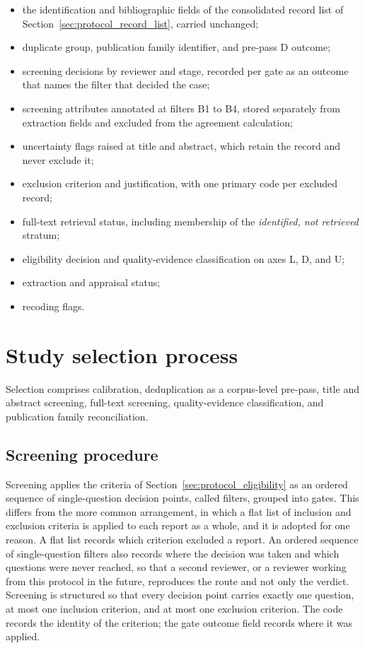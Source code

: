 \begin{itemize}
    \item the identification and bibliographic fields of the consolidated record list of Section~\ref{sec:protocol_record_list}, carried unchanged;
    \item duplicate group, publication family identifier, and pre-pass D outcome;
    \item screening decisions by reviewer and stage, recorded per gate as an outcome that names the filter that decided the case;
    \item screening attributes annotated at filters B1 to B4, stored separately from extraction fields and excluded from the agreement calculation;
    \item uncertainty flags raised at title and abstract, which retain the record and never exclude it;
    \item exclusion criterion and justification, with one primary code per excluded record;
    \item full-text retrieval status, including membership of the \textit{identified, not retrieved} stratum;
    \item eligibility decision and quality-evidence classification on axes L, D, and U;
    \item extraction and appraisal status;
    \item recoding flags.
\end{itemize}

\section{Study selection process}
\label{sec:protocol_selection}

Selection comprises calibration, deduplication as a corpus-level pre-pass, title and abstract screening, full-text screening, quality-evidence classification, and publication family reconciliation.

\subsection{Screening procedure}
\label{sec:protocol_gates}

Screening applies the criteria of Section~\ref{sec:protocol_eligibility} as an ordered sequence of single-question decision points, called filters, grouped into gates. This differs from the more common arrangement, in which a flat list of inclusion and exclusion criteria is applied to each report as a whole, and it is adopted for one reason. A flat list records which criterion excluded a report. An ordered sequence of single-question filters also records where the decision was taken and which questions were never reached, so that a second reviewer, or a reviewer working from this protocol in the future, reproduces the route and not only the verdict. Screening is structured so that every decision point carries exactly one question, at most one inclusion criterion, and at most one exclusion criterion. The code records the identity of the criterion; the gate outcome field records where it was applied.

